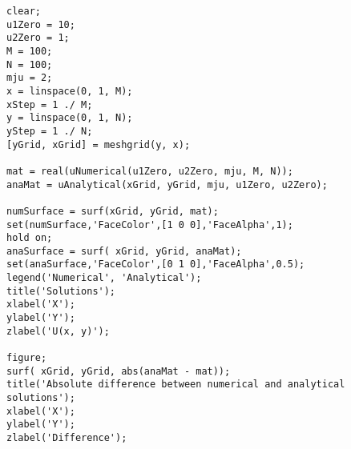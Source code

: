 \documentclass[11pt, oneside, final]{article}
\begin{document}
    \begin{verbatim}
clear;
u1Zero = 10;
u2Zero = 1;
M = 100;
N = 100;
mju = 2;
x = linspace(0, 1, M);
xStep = 1 ./ M;
y = linspace(0, 1, N);
yStep = 1 ./ N;
[yGrid, xGrid] = meshgrid(y, x);

mat = real(uNumerical(u1Zero, u2Zero, mju, M, N));
anaMat = uAnalytical(xGrid, yGrid, mju, u1Zero, u2Zero);

numSurface = surf(xGrid, yGrid, mat);
set(numSurface,'FaceColor',[1 0 0],'FaceAlpha',1);
hold on;
anaSurface = surf( xGrid, yGrid, anaMat);
set(anaSurface,'FaceColor',[0 1 0],'FaceAlpha',0.5);
legend('Numerical', 'Analytical');
title('Solutions');
xlabel('X');
ylabel('Y');
zlabel('U(x, y)');

figure;
surf( xGrid, yGrid, abs(anaMat - mat));
title('Absolute difference between numerical and analytical solutions');
xlabel('X');
ylabel('Y');
zlabel('Difference');


        \end{verbatim}
    
\end{document}
